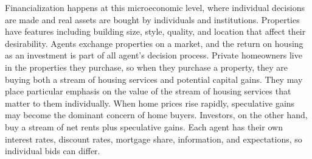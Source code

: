 




Financialization happens at this microeconomic level, where individual decisions are made and real assets are bought by individuals and institutions. 
Properties have features including building size, style, quality, and location that affect their desirability. 
Agents exchange properties on a market,  
and the return on housing as an investment is part of all agent's decision process. 
Private homeowners live in the properties they purchase, so when they purchase a property, they are buying both a stream of housing services and potential capital gains. %
They may place particular emphasis on the value of the stream of housing services that matter to them individually. When home prices rise rapidly, speculative gains may become the dominant concern of home buyers. 
Investors, on the other hand, buy a stream of net rents plus speculative gains.
Each agent has their own interest rates, discount rates, mortgage share, information, and expectations, so individual bids can differ. 

